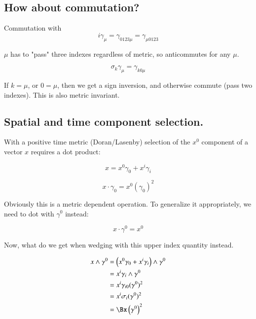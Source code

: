 \subsection{How about commutation? }

Commutation with
\begin{equation*}
i \gamma_{\mu} = \gamma_{0123\mu} = \gamma_{\mu0123}
\end{equation*}

$\mu$ has to "pass" three indexes regardless of metric, so anticommutes for any $\mu$.

\begin{equation*}
\sigma_k \gamma_{\mu} = \gamma_{k0\mu}
\end{equation*}

If $k = \mu$, or $0 = \mu$, then we get a sign inversion, and otherwise commute (pass two indexes).  This is also metric invariant.

\subsection{Spatial and time component selection. }

With a positive time metric (Doran/Lasenby) selection of the $x^0$ component of a vector $x$ requires a dot product:

\begin{equation*}
x = x^0 \gamma_0 + x^i \gamma_i
\end{equation*}

\begin{equation*}
x \cdot \gamma_0 = x^0 (\gamma_0)^2
\end{equation*}

Obviously this is a metric dependent operation.  To generalize it appropriately, we need to dot with $\gamma^0$ instead:

\begin{equation*}
x \cdot \gamma^0 = x^0
\end{equation*}

Now, what do we get when wedging with this upper index quantity instead.

\begin{align*}
x \wedge \gamma^0
&= \left(x^0 \gamma_0 + x^i \gamma_i\right) \wedge \gamma^0 \\
&= x^i \gamma_i \wedge \gamma^0 \\
&= x^i \gamma_{i0} (\gamma^0)^2 \\
&= x^i \sigma_i (\gamma^0)^2 \\
&= \Bx \left(\gamma^0\right)^2
\end{align*}

